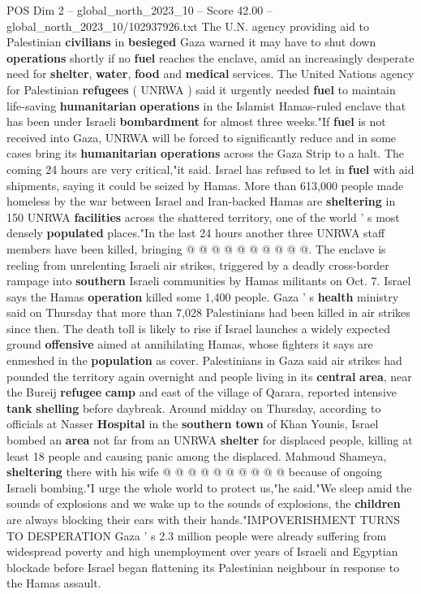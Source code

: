 \begin{textsample}{POS Dim 2 – global\_north\_2023\_10 – Score 42.00 – global\_north\_2023\_10/102937926.txt}  \label{ex:f2_pos_281}
The U.N. agency providing aid to Palestinian \textbf{civilians} in \textbf{besieged} Gaza warned it may have to shut down \textbf{operations} shortly if no \textbf{fuel} reaches the enclave, amid an increasingly desperate need for \textbf{shelter}, \textbf{water}, \textbf{food} and \textbf{medical} services.
The United Nations agency for Palestinian \textbf{refugees} ( UNRWA ) said it urgently needed \textbf{fuel} to maintain life-saving \textbf{humanitarian} \textbf{operations} in the Islamist Hamas-ruled enclave that has been under Israeli \textbf{bombardment} for almost three weeks."If \textbf{fuel} is not received into Gaza, UNRWA will be forced to significantly reduce and in some cases bring its \textbf{humanitarian} \textbf{operations} across the Gaza Strip to a halt.
The coming 24 hours are very critical,"it said.
Israel has refused to let in \textbf{fuel} with aid shipments, saying it could be seized by Hamas.
More than 613,000 people made homeless by the war between Israel and Iran-backed Hamas are \textbf{sheltering} in 150 UNRWA \textbf{facilities} across the shattered territory, one of the world ' s most densely \textbf{populated} places."In the last 24 hours another three UNRWA staff members have been killed, bringing @ @ @ @ @ @ @ @ @ @.
The enclave is reeling from unrelenting Israeli air strikes, triggered by a deadly cross-border rampage into \textbf{southern} Israeli communities by Hamas militants on Oct. 7.
Israel says the Hamas \textbf{operation} killed some 1,400 people.
Gaza ' s \textbf{health} ministry said on Thursday that more than 7,028 Palestinians had been killed in air strikes since then.
The death toll is likely to rise if Israel launches a widely expected ground \textbf{offensive} aimed at annihilating Hamas, whose fighters it says are enmeshed in the \textbf{population} as cover.
Palestinians in Gaza said air strikes had pounded the territory again overnight and people living in its \textbf{central} \textbf{area}, near the Bureij \textbf{refugee} \textbf{camp} and east of the village of Qarara, reported intensive \textbf{tank} \textbf{shelling} before daybreak.
Around midday on Thursday, according to officials at Nasser \textbf{Hospital} in the \textbf{southern} \textbf{town} of Khan Younis, Israel bombed an \textbf{area} not far from an UNRWA \textbf{shelter} for displaced people, killing at least 18 people and causing panic among the displaced.
Mahmoud Shameya, \textbf{sheltering} there with his wife @ @ @ @ @ @ @ @ @ @ because of ongoing Israeli bombing."I urge the whole world to protect us,"he said."We sleep amid the sounds of explosions and we wake up to the sounds of explosions, the \textbf{children} are always blocking their ears with their hands."IMPOVERISHMENT TURNS TO DESPERATION Gaza ' s 2.3 million people were already suffering from widespread poverty and high unemployment over years of Israeli and Egyptian blockade before Israel began flattening its Palestinian neighbour in response to the Hamas assault.

\end{textsample}
